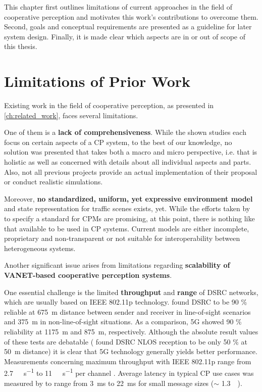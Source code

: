 This chapter first outlines limitations of current approaches in the field of cooperative perception and motivates this work's contributions to overcome them. Second, goals and conceptual requirements are presented as a guideline for later system design. Finally, it is made clear which aspects are in or out of scope of this thesis.

\section{Limitations of Prior Work}
\label{sec:problem_analysis:limitations_of_prior_work}

Existing work in the field of cooperative perception, as presented in \cref{ch:related_work}, faces several limitations.
\par
\bigskip

One of them is a \textbf{lack of comprehensiveness}. While the shown studies each focus on certain aspects of a CP system, to the best of our knowledge, no solution was presented that takes both a macro and micro perspective, i.e. that is holistic as well as concerned with details about all individual aspects and parts. Also, not all previous projects provide an actual implementation of their proposal or conduct realistic simulations.
\par
\bigskip

Moreover, \textbf{no standardized, uniform, yet expressive environment model} and state representation for traffic scenes exists, yet. While the efforts taken by \cite{EuropeanTelecommunicationsStandardsInstituteETSI2019} to specify a standard for CPMs are promising, at this point, there is nothing like that available to be used in CP systems. Current models are either incomplete, proprietary and non-transparent or not suitable for interoperability between heterogeneous systems. 
\par
\bigskip

Another significant issue arises from limitations regarding \textbf{scalability of VANET-based cooperative perception systems}.

One essential challenge is the limited \textbf{throughput} and \textbf{range} of DSRC networks, which are usually based on IEEE 802.11p technology. \cite{5GAutomotiveAssociation2018} found DSRC to be 90 \% reliable at \SI{675}{\meter} distance between sender and receiver in line-of-sight scenarios and \SI{375}{\meter} in non-line-of-sight situations. As a comparison, 5G showed 90 \% reliability at \SI{1175}{\meter} and \SI{875}{\meter}, respectively. Although the absolute result values of these tests are debatable (\cite{Mangel2011} found DSRC NLOS reception to be only 50 \% at \SI{50}{\meter} distance) it is clear that 5G technology generally yields better performance. Measurements concerning maximum throughput with IEEE 802.11p range from \SI{2.7}{\mega\bit\per\second} to \SI{11}{\mega\bit\per\second} per channel \cite{Chen2016, Wang2013}. Average latency in typical CP use cases was measured by \cite{Rauch2011} to range from \SI{3}{\milli\second} to \SI{22}{\milli\second} for small message sizes ($\sim$ \SI{1.3}{\kilo\byte}).


